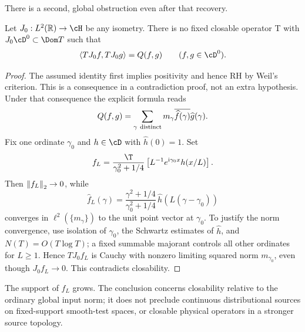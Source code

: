 There is a second, global obstruction even after that recovery.
\begin{theorem}\label{thm:nonclosable}
Let $J_0:L^2(\R)\to\cH$ be any isometry. There is no fixed
closable operator T with $J_0\cD^0\subset\Dom T$ such that
\begin{equation}
\ip{TJ_0f}{TJ_0g}=Q(f,g)\qquad(f,g\in\cD^0).
\end{equation}
\end{theorem}
\begin{proof}
The assumed identity first implies positivity and hence RH by
Weil's criterion. This is a consequence in a contradiction proof,
not an extra hypothesis. Under that consequence the explicit
formula reads
\begin{equation}\label{eq:zero-pairing}
Q(f,g)=\sum_{\gamma\ {\rm distinct}}m_\gamma
             \overline{\widehat f(\gamma)}\widehat g(\gamma).
\end{equation}
Fix one ordinate $\gamma_0$ and $h\in\cD$ with $\widehat h(0)=1$.
Set
\begin{equation}
f_L=\frac{\T}{\gamma_0^2+1/4}
        \left[L^{-1}e^{\ii\gamma_0x}h(x/L)\right].
\end{equation}
Then $\left\lVert f_L\right\rVert_2\to0$, while
\[
\widehat f_L(\gamma)=
\frac{\gamma^2+1/4}{\gamma_0^2+1/4}
\,\widehat h(L(\gamma-\gamma_0))
\]
converges in $\ell^2(\{m_\gamma\})$ to the unit point vector
at $\gamma_0$. To justify the norm convergence, use isolation
of $\gamma_0$, the Schwartz estimates of $\widehat h$, and
$N(T)=O(T\log T)$; a fixed summable majorant controls all
other ordinates for $L\ge1$. Hence $TJ_0f_L$ is Cauchy with
nonzero limiting squared norm $m_{\gamma_0}$, even though
$J_0f_L\to0$. This contradicts closability.
\end{proof}
The support of $f_L$ grows. The conclusion concerns closability
relative to the ordinary global \Ltwo{} input norm; it does not
preclude continuous distributional sources on fixed-support
smooth-test spaces, or closable physical operators in a
stronger source topology.
